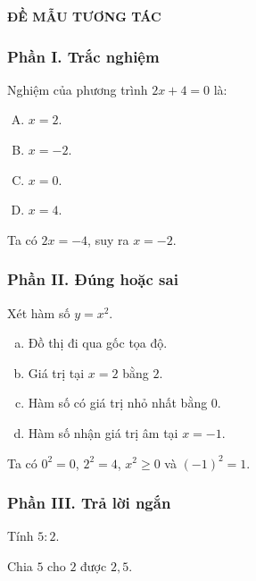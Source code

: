 \begin{center}\textbf{{\Huge ĐỀ MẪU TƯƠNG TÁC}}\end{center}
\subsubsection*{Phần I. Trắc nghiệm}
\begin{baitap}
Nghiệm của phương trình $2x+4=0$ là:
\begin{enumerate}[A.]
\item $x=2$.
\item $x=-2$.
\item $x=0$.
\item $x=4$.
\end{enumerate}
\begin{traloi}
Ta có $2x=-4$, suy ra $x=-2$.
\end{traloi}
\end{baitap}
\subsubsection*{Phần II. Đúng hoặc sai}
\begin{baitap}
Xét hàm số $y=x^2$.
\begin{enumerate}[a)]
\item Đồ thị đi qua gốc tọa độ.
\item Giá trị tại $x=2$ bằng $2$.
\item Hàm số có giá trị nhỏ nhất bằng $0$.
\item Hàm số nhận giá trị âm tại $x=-1$.
\end{enumerate}
\begin{traloi}
Ta có $0^2=0$, $2^2=4$, $x^2\ge0$ và $(-1)^2=1$.
\end{traloi}
\end{baitap}
\subsubsection*{Phần III. Trả lời ngắn}
\begin{baitap}
Tính $5:2$.
\begin{traloi}
Chia $5$ cho $2$ được $2{,}5$.
\end{traloi}
\end{baitap}
